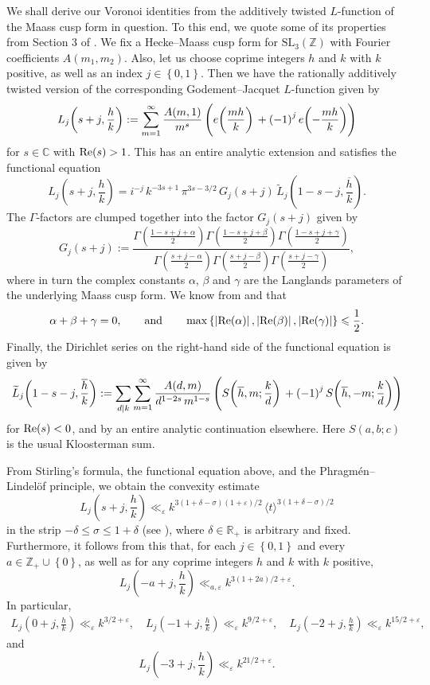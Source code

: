 \documentclass[a4paper,10pt,twoside]{amsart}
\theoremstyle{definition}
\numberwithin{equation}{section}
\newcommand\eps{\varepsilon}
\renewcommand{\Re}{\textnormal{Re}}
\renewcommand\:{\colon}
\begin{document}
\noindent We shall derive our Voronoi identities from the additively twisted $L$-function of the Maass cusp form in question. To this end, we quote some of its properties from Section 3 of \cite{Goldfeld--Li1}. 
We fix a Hecke--Maass cusp form for $\mathrm{SL}_3(\mathbb Z)$ with Fourier coefficients $A(m_1,m_2)$. Also, let us choose coprime integers $h$ and $k$ with $k$ positive, as well as an index $j\in\left\{0,1\right\}$. Then we have the rationally additively twisted version of the corresponding Godement--Jacquet $L$-function given by
\[L_j\!\left(s+j,\frac hk\right):=\sum_{m=1}^\infty\frac{A(m,1)}{m^s}\left(e\!\left(\frac{mh}k\right)\vphantom{\Bigg|}+\left(-1\right)^je\!\left(-\frac{mh}k\right)\right)\]
for $s\in\mathbb C$ with $\Re(s)>1$. This has an entire analytic extension and satisfies the functional equation
\[L_j\!\left(s+j,\frac hk\right)=i^{-j}\,k^{-3s+1}\,\pi^{3s-3/2}\,G_j(s+j)\,\widetilde L_j\!\left(1-s-j,\frac{\overline h}k\right).\]
The $\Gamma$-factors are clumped together into the factor $G_j(s+j)$ given by
\[G_j(s+j):=\frac{\displaystyle{\Gamma\!\left(\frac{1-s+j+\alpha}2\right)\Gamma\!\left(\frac{1-s+j+\beta}2\right)\Gamma\!\left(\frac{1-s+j+\gamma}2\right)}}{\displaystyle{\Gamma\!\left(\frac{s+j-\alpha}2\right)\Gamma\!\left(\frac{s+j-\beta}2\right)\Gamma\!\left(\frac{s+j-\gamma}2\right)}},\]
where in turn the complex constants $\alpha$, $\beta$ and $\gamma$ are the Langlands parameters of the underlying Maass cusp form. We know from \cite[Props.\ 6.3.1 \& 12.1.9]{Goldfeld} and \cite[Eq.\ (3.30)]{Goldfeld--Li1} that
\[\alpha+\beta+\gamma=0,\qquad\text{and}\qquad\max\left\{\left|\Re(\alpha)\right|,\left|\Re(\beta)\right|,\left|\Re(\gamma)\right|\right\}\leqslant\frac12.\]
Finally, the Dirichlet series on the right-hand side of the functional equation is given by
\[\widetilde L_j\!\left(1-s-j,\frac{\overline h}k\right)
:=\sum_{d\mid k}\sum_{m=1}^\infty\frac{A(d,m)}{d^{1-2s}\,m^{1-s}}
\left(S\!\left(\overline h,m;\frac kd\right)\vphantom{\Bigg|}+\left(-1\right)^jS\!\left(\overline h,-m;\frac kd\right)\right)\]
for $\Re(s)<0$, and by an entire analytic continuation elsewhere. Here $S(a,b;c)$ is the usual Kloosterman sum. 

From Stirling's formula, the functional equation above, and the Phragm\'en--Lindel\"of principle, we obtain the convexity estimate
\[L_j\!\left(s+j,\frac hk\right)\ll_\eps k^{3(1+\delta-\sigma)(1+\varepsilon)/2}\,\langle t\rangle^{3(1+\delta-\sigma)/2}\]
in the strip $-\delta\leqslant\sigma\leqslant 1+\delta$ (see \cite[p. 262]{Jaasaari--Vesalainen1}), where $\delta\in\mathbb R_+$ is arbitrary and fixed. Furthermore, it follows from this that, for each $j\in\left\{0,1\right\}$ and every $a\in\mathbb Z_+\cup\left\{0\right\}$, as well as for any coprime integers $h$ and $k$ with $k$ positive,
\[L_j\!\left(-a+j,\frac hk\right)\ll_{a,\eps} k^{3\left(1+2a\right)/2+\varepsilon}.\]
In particular,
\begin{align}\label{L-bounds}
L_j\!\left(0+j,\frac hk\right)\ll_\eps k^{3/2+\varepsilon},\quad
L_j\!\left(-1+j,\frac hk\right)\ll_\eps k^{9/2+\varepsilon},\quad
L_j\!\left(-2+j,\frac hk\right)\ll_\eps k^{15/2+\varepsilon},
\end{align}
and
\[L_j\!\left(-3+j,\frac hk\right)\ll_\eps k^{21/2+\varepsilon}.\]
\end{document}
